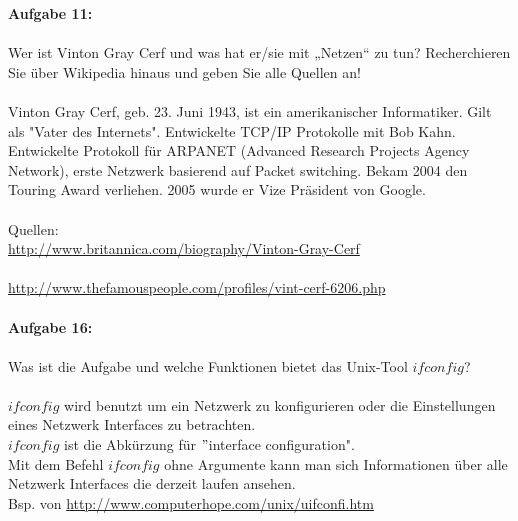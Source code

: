 \documentclass[12pt,a4paper]{report}
\theoremstyle{definition}
\begin{document}
\textbf{Aufgabe 11:}
\\
\\
Wer ist Vinton Gray Cerf und was hat er/sie mit „Netzen“ zu tun? Recherchieren Sie über
Wikipedia hinaus und geben Sie alle Quellen an!
\\
\\
Vinton Gray Cerf, geb. 23. Juni 1943, ist ein amerikanischer Informatiker. Gilt als "Vater des Internets". Entwickelte TCP/IP Protokolle mit Bob Kahn. Entwickelte Protokoll für ARPANET (Advanced Research Projects Agency Network), erste Netzwerk basierend auf Packet switching. Bekam 2004 den Touring Award verliehen. 2005 wurde er Vize Präsident von Google.
\\
\\
Quellen:\\
\url{http://www.britannica.com/biography/Vinton-Gray-Cerf}\\
\\
\url{http://www.thefamouspeople.com/profiles/vint-cerf-6206.php}
\\
\\
\textbf{Aufgabe 16:}
\\
\\
Was ist die Aufgabe und welche Funktionen bietet das Unix-Tool $ifconfig$?
\\
\\
$ifconfig$ wird benutzt um ein Netzwerk zu konfigurieren oder die Einstellungen eines Netzwerk Interfaces zu betrachten.
\\
$ifconfig$ ist die Abkürzung für $"$interface configuration".\\
Mit dem Befehl $ifconfig$ ohne Argumente kann man sich Informationen über alle Netzwerk Interfaces die derzeit laufen ansehen. 
\\
Bsp. von \url{http://www.computerhope.com/unix/uifconfi.htm}\\
\\
\end{document}
